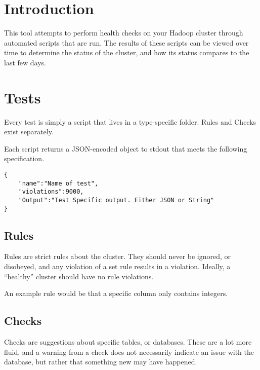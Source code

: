 \begin{abstract}
This project attempts to act as a health report for your hadoop cluster. At its core, this tool acts as a Hadoop
Testing Framework. Tests are either in the form of rules or checks, and either flag the table for review if a rule
fails, or throws a warning if a check fails. Tests can be scheduled, and the incremental output can be viewed through
the local frontend. This allows for the user to view the health and status of their database over time.
\end{abstract}

\section{Introduction}
This tool attempts to perform health checks on your Hadoop cluster through automated scripts that are run. The results
of these scripts can be viewed over time to determine the status of the cluster, and how its status compares to the
last few days.

\section{Tests}
Every test is simply a script that lives in a type-specific folder. Rules and Checks exist separately.

Each script returns a JSON-encoded object to {\ttfamily stdout} that meets the following specification.

\begin{verbatim}
{
    "name":"Name of test",
    "violations":9000,
    "Output":"Test Specific output. Either JSON or String"
}
\end{verbatim}


    \subsection{Rules}
    Rules are strict rules about the cluster. They should never be ignored, or disobeyed, and any violation of a set rule
    results in a violation. Ideally, a ``healthy'' cluster should have no rule violations.

    An example rule would be that a specific column only contains integers.

    \subsection{Checks}
    Checks are suggestions about specific tables, or databases. These are a lot more fluid, and a warning from a check does
    not necessarily indicate an issue with the database, but rather that something new may have happened.

